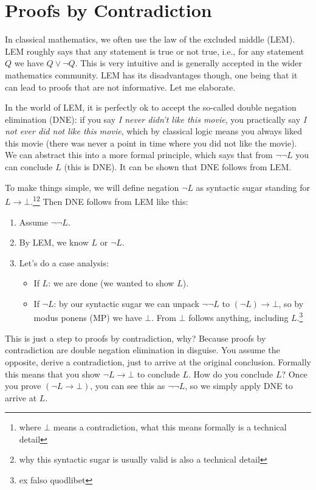 \documentclass{article}
\begin{document}
\section{Proofs by Contradiction}

In classical mathematics, we often use the law of the excluded middle (LEM).
LEM roughly says that any statement is true or not true, i.e., for any statement $Q$ we have $Q \lor \neg Q$.
This is very intuitive and is generally accepted in the wider mathematics community.
LEM has its disadvantages though, one being that it can lead to proofs  that are not informative.
Let me elaborate.

In the world of LEM, it is perfectly ok to accept the so-called double negation elimination (DNE): if you say \emph{I never didn't like this movie}, you practically say \emph{I not ever did not like this movie}, which by classical logic means you always liked this movie (there was never a point in time where you did not like the movie).
We can abstract this into a more formal principle, which says that from $\neg \neg L$ you can conclude $L$ (this is DNE).
It can be shown that DNE follows from LEM.

To make things simple, we will define negation $\neg L$ as syntactic sugar standing for $L \to \bot$.\footnote{where $\bot$ means a contradiction, what this means formally is a technical detail}\footnote{why this syntactic sugar is usually valid is also a technical detail}
Then DNE follows from LEM like this:
\begin{enumerate}
\item Assume $\neg \neg L$.
\item By LEM, we know $L$ or $\neg L$.
\item Let's do a case analysis:
\begin{itemize}
\item If $L$: we are done (we wanted to show $L$).
\item If $\neg L$: by our syntactic sugar we can unpack $\neg\neg L$ to $(\neg L) \to \bot$, so by modus ponens (MP) we have $\bot$. From $\bot$ follows anything, including $L$.\footnote{ex falso quodlibet}
\end{itemize}
\end{enumerate}

This is just a step to proofs by contradiction, why?
Because proofs by contradiction are double negation elimination in disguise. 
You assume the opposite, derive a contradiction, just to arrive at the original conclusion.
Formally this means that you show $\neg L \to \bot$ to conclude $L$.
How do you conclude $L$? 
Once you prove $(\neg L \to \bot)$, you can see this as $\neg \neg L$, so we simply apply DNE to arrive at $L$.
\end{document}
